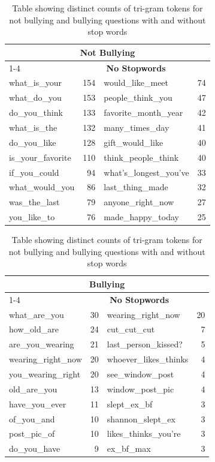 \begin{table}[h]
\centering
\caption[Distinct tri-gram word counts]{Table showing distinct counts of tri-gram tokens for not bullying and bullying questions with and without stop words}
\label{tab:chapter4:word_count_tri-gram}
\begin{tabular}{lrlr}
	\toprule
	\multicolumn{4}{c}{\textbf{Not Bullying}} \\
	\cmidrule(r){1-4}
	\multicolumn{2}{c}{\textbf{With Stopwords}} & \multicolumn{2}{c}{\textbf{No Stopwords}} \\
    \midrule
	what\_is\_your		& 154 &	would\_like\_meet		& 74 \\
	what\_do\_you		& 153 &	people\_think\_you		& 47 \\
	do\_you\_think		& 133 &	favorite\_month\_year	& 42 \\
	what\_is\_the		& 132 &	many\_times\_day		& 41 \\
	do\_you\_like		& 128 &	gift\_would\_like		& 40 \\
	is\_your\_favorite	& 110 &	think\_people\_think	& 40 \\
	if\_you\_could		& 94 &	what's\_longest\_you've	& 33 \\
	what\_would\_you	& 86 &	last\_thing\_made		& 32 \\
	was\_the\_last		& 79 &	anyone\_right\_now		& 27 \\
	you\_like\_to		& 76 &	made\_happy\_today		& 25 \\
    \bottomrule
    \end{tabular}
\begin{tabular}{lrlr}
	\toprule
	\multicolumn{4}{c}{\textbf{Bullying}} \\
	\cmidrule(r){1-4}
	\multicolumn{2}{c}{\textbf{With Stopwords}} & \multicolumn{2}{c}{\textbf{No Stopwords}} \\
    \midrule
	what\_are\_you		& 30 &	wearing\_right\_now		& 20 \\
	how\_old\_are		& 24 &	cut\_cut\_cut			& 7 \\
	are\_you\_wearing	& 21 &	last\_person\_kissed?	& 5 \\
	wearing\_right\_now	& 20 &	whoever\_likes\_thinks	& 4 \\
	you\_wearing\_right	& 20 &	see\_window\_post		& 4 \\
	old\_are\_you		& 13 &	window\_post\_pic		& 4 \\
	have\_you\_ever		& 11 &	slept\_ex\_bf			& 3 \\
	of\_you\_and		& 10 &	shannon\_slept\_ex		& 3 \\
	post\_pic\_of		& 10 &	likes\_thinks\_you're	& 3 \\
	do\_you\_have		& 9  &	ex\_bf\_max				& 3 \\
    \bottomrule
    \end{tabular}
\end{table}

